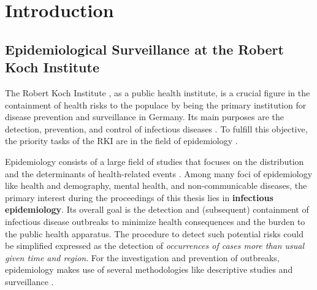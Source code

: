 \chapter{Introduction}

\section{Epidemiological Surveillance at the Robert Koch Institute}
The Robert Koch Institute , as a public health institute, is a crucial figure in the containment of health risks to the populace by being the primary institution for disease prevention and surveillance in Germany.
Its main purposes are the detection, prevention, and control of infectious diseases \citep{rki_definition}.
To fulfill this objective, the priority tasks of the RKI are in the field of epidemiology \citep{rki_definition}.

Epidemiology consists of a large field of studies that focuses on the distribution and the determinants of health-related events \citep{WHOepi}.
Among many foci of epidemiology like health and demography, mental health, and non-communicable diseases, the primary interest during the proceedings of this thesis lies in \textbf{infectious epidemiology}.
Its overall goal is the detection and (subsequent) containment of infectious disease outbreaks to minimize health consequences and the burden to the public health apparatus.
The procedure to detect such potential risks could be simplified expressed as the detection of \textit{occurrences of cases more than usual given time and region}.
For the investigation and prevention of outbreaks, epidemiology makes use of several methodologies like descriptive studies and surveillance \citep{WHOepi}.

